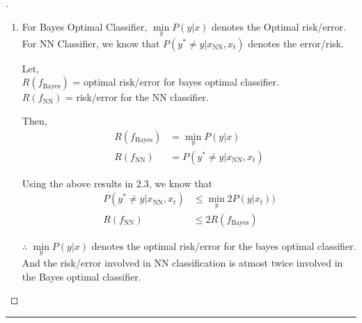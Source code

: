\documentclass[a4paper, 12pt]{article}
\begin{document}
\begin{proof}[]
\begin{enumerate}[label={\color{blue}{\textbf{2.\arabic*})}}]
    \item 
        For Bayes Optimal Classifier, $\min\limits_y P(y|x)$ denotes the Optimal risk/error. \\
        For NN Classifier, we know that $P(y^* \neq y|x_{\text{NN}},x_t)$ denotes the error/risk. 
        
        Let, \\
        $R(f_{\text{Bayes}})$ = optimal risk/error for bayes optimal classifier.\\
        $R(f_{\text{NN}})$ = risk/error for the NN classifier.
        
        Then, 
        \begin{align*}
            R(f_{\text{Bayes}}) &= \min\limits_y P(y|x) \\
        R(f_{\text{NN}}) &= P(y^* \neq y|x_{\text{NN}},x_t)
        \end{align*}
        
        
        
        Using the above results in $2.3$, we know that 
        \begin{align*}
            P(y^* \neq y|x_{\text{NN}},x_t) &\leq  \min\limits_y 2P(y|x_t)) \\
            R(f_{\text{NN}}) &\leq 2R(f_{\text{Bayes}})
        \end{align*}
        
        $\therefore$ $\min\limits_y P(y|x)$ denotes the optimal risk/error for the bayes optimal classifier. And the risk/error involved in NN classification is atmost twice involved in the Bayes optimal classifier. 
    
\end{enumerate}
\end{proof}
\hrule
\bigskip
\end{document}
